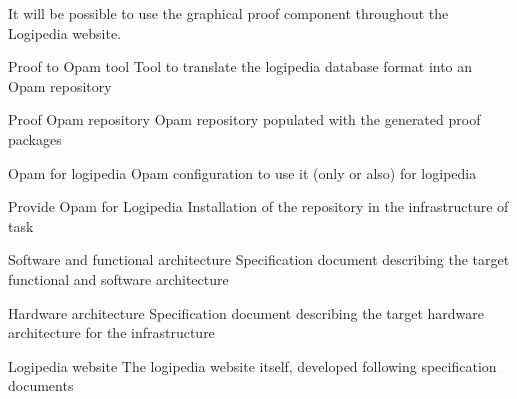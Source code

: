 \begin{workpackage}[id=access,wphases=0-48,type=MGT,
  short=Access,%
  title={Access to the infrastructure},
  lead=Inr,
  InrRM=28,%
  OcaRM=6]
\begin{tasklist}
\begin{task}[id=edukera,
      title=Web interface for doing proofs at school,
      lead=Edu,EduRM=12]
      It will be possible to use the graphical proof component throughout
      the Logipedia website.

  \end{task}

\end{tasklist}

\begin{wpdelivs}
  \begin{wpdeliv}[due=2,miles=???,id=opamtool,dissem=PU,nature=DEM,lead=Oca]{Proof to Opam tool}
    Tool to translate the logipedia database format into an Opam repository
  \end{wpdeliv}

  \begin{wpdeliv}[due=2,miles=???,id=opamrepo,dissem=PU,nature=DEM,lead=Oca]{Proof Opam repository}
    Opam repository populated with the generated proof packages
  \end{wpdeliv}

  \begin{wpdeliv}[due=1,miles=???,id=opamconfig,dissem=PU,nature=DEM,lead=Oca]{Opam for logipedia}
    Opam configuration to use it (only or also) for logipedia
  \end{wpdeliv}

  \begin{wpdeliv}[due=1,miles=???,id=opaminstall,dissem=PU,nature=DEM,lead=Oca]{Provide Opam for Logipedia}
    Installation of the repository in the infrastructure of task 
  \end{wpdeliv}

  \begin{wpdeliv}[due=18,miles=???,id=archi-spec,dissem=PU,nature=R,lead=Irt]{Software and functional architecture}
    Specification document describing the target functional and software architecture
  \end{wpdeliv}

  \begin{wpdeliv}[due=20,miles=???,id=infra-spec,dissem=PU,nature=R,lead=Irt]{Hardware architecture}
    Specification document describing the target hardware architecture for the infrastructure
  \end{wpdeliv}

  \begin{wpdeliv}[due=48,miles=???,id=website,dissem=PU,nature=D,lead=Irt]{Logipedia website}
    The logipedia website itself, developed following specification documents
  \end{wpdeliv}


\end{wpdelivs}
\end{workpackage}
